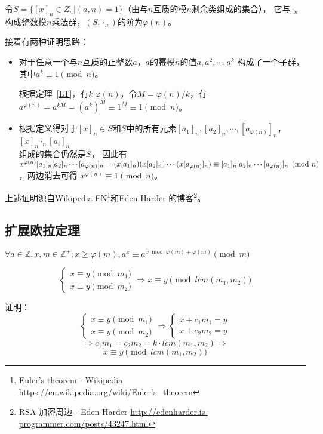 令$S=\{[x]_n\in Z_n|(a,n)=1\}$（由与$n$互质的模$n$剩余类组成的集合），
它与$\cdot_n$构成整数模$n$乘法群，$(S,\cdot_n)$的阶为$\varphi(n)$。

接着有两种证明思路：
\begin{itemize}
	\item 对于任意一个与$n$互质的正整数$a$，$a$的幂模$n$的值$a,a^2,\cdots,a^k$
	      构成了一个子群，其中$a^k\equiv 1 \pmod{n}$。

	      根据定理~\ref{LT}，有$k|\varphi(n)$，令$M=\varphi(n)/k$，有
	      $a^{\varphi(n)}=a^{kM}=(a^k)^M\equiv 1^M\equiv 1 \pmod{n}$。
	\item 根据定义得对于$[x]_n\in S$和$S$中的所有元素$[a_1]_n,[a_2]_n,\cdots,
		[a_{\varphi(n)}]_n$，$[x]_n \cdot_n [a_i]_n$\\组成的集合仍然是$S$，
		因此有$x^{\varphi(n)}[a_1]_n[a_2]_n\cdots[a_{\varphi(n)}]_n=
		(x[a_1]_n)(x[a_2]_n)\cdots\\(x[a_{\varphi(n)}]_n)\equiv[a_1]_n
		[a_2]_n\cdots[a_{\varphi(n)}]_n\pmod{n}$，两边消去可得
		$x^{\varphi(n)}\equiv 1\pmod{n}$。
\end{itemize}

上述证明源自Wikipedia-EN\footnote{Euler's theorem - Wikipedia
	\url{https://en.wikipedia.org/wiki/Euler's\_theorem}}和Eden Harder
的博客\footnote{RSA 加密周边 - Eden Harder
	\url{http://edenharder.is-programmer.com/posts/43247.html}}。
\subsection{扩展欧拉定理}
\begin{theorem}\label{exEuler}
	$\forall a\in \mathbb{Z},x,m\in \mathbb{Z^+},x\geq \varphi(m)
		,a^x\equiv a^{x \bmod \varphi(m)+\varphi(m)} \pmod{m}$
\end{theorem}

\begin{lemma}\label{EEL1}
	\begin{displaymath}
		\left\{
		\begin{array}{l}
			x\equiv y \pmod{m_1} \\
			x\equiv y \pmod{m_2}
		\end{array}
		\right.
		\Rightarrow x\equiv y \pmod{lcm(m_1,m_2)}
	\end{displaymath}
\end{lemma}

证明：
\begin{displaymath}
	\left\{
	\begin{array}{l}
		x\equiv y \pmod{m_1} \\
		x\equiv y \pmod{m_2}
	\end{array}
	\right.
	\Rightarrow
	\left\{
	\begin{array}{l}
		x+c_1m_1=y \\
		x+c_2m_2=y
	\end{array}
	\right.
\end{displaymath}
\begin{displaymath}
	\Rightarrow
	c_1m_1=c_2m_2=k\cdot lcm(m_1,m_2)
	\Rightarrow
\end{displaymath}
\begin{displaymath}
	x \equiv y \pmod{lcm(m_1,m_2)}
\end{displaymath}

